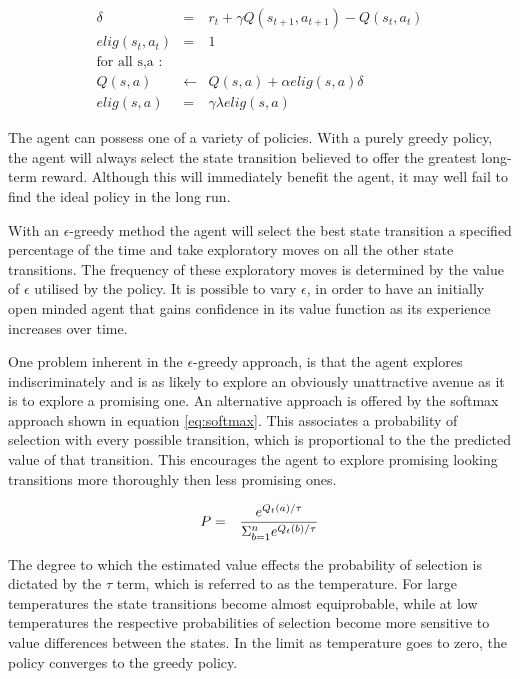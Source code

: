 \documentclass{rucsthesis}
\begin{document}
\begin{eqnarray}
\delta & = & r_{t} + \gamma Q(s_{t+1},a_{t+1}) - Q(s_t,a_t) \\
elig(s_t,a_t) & = & 1 \\
 \textrm{for all s,a : } & &  \\
Q(s,a) & \leftarrow & Q(s,a) + \alpha elig(s,a) \delta \label{eq:sarsaelig} \\
elig(s,a) & = & \gamma \lambda elig(s,a)
\end{eqnarray}

The agent can possess one of a variety of policies. With a purely greedy policy, the agent will always select the state transition believed to offer the greatest long-term reward. Although this will immediately benefit the agent, it may well fail to find the ideal policy in the long run. 

With an $\epsilon$-greedy method the agent will select the best state transition a specified percentage of the time and take exploratory moves on all the other state transitions. The frequency of these exploratory moves is determined by the value of $\epsilon$ utilised by the policy. It is possible to vary $\epsilon$, in order to have an initially open minded agent that gains confidence in its value function as its experience increases over time. 

One problem inherent in the $\epsilon$-greedy approach, is that the agent explores indiscriminately and is as likely to explore an obviously unattractive avenue as it is to explore a promising one. An alternative approach is offered by the softmax approach shown in equation \ref{eq:softmax}. This associates a probability of selection with every possible transition, which is proportional to the the predicted value of that transition. This encourages the agent to explore promising looking transitions more thoroughly then less promising ones.

\begin{eqnarray}
\centering
P & = & \frac{e^{Q_{t}(a)/\tau}}{\Sigma_{b=1}^{n}e^{Q_{t}(b)/\tau}} \label{eq:softmax}
\end{eqnarray}

The degree to which the estimated value effects the probability of selection is dictated by the $\tau$ term, which is referred to as the temperature. For large temperatures the state transitions become almost equiprobable, while at low temperatures the respective probabilities of selection become more sensitive to value differences between the states.  In the limit as temperature goes to zero, the policy converges to the greedy policy.
\end{document}
